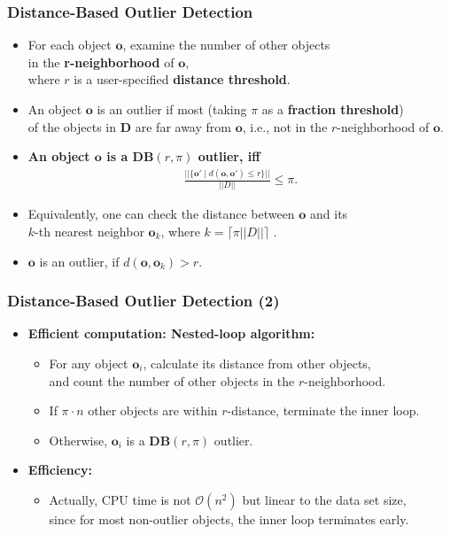 \begin{frame}
  \frametitle{Distance-Based Outlier Detection }
  \begin{itemize}
  \item For each object $\mathbf{o}$, examine the number of other objects \\
    in the \textbf{r-neighborhood} of $\mathbf{o}$, \\
    where $r$ is a user-specified \textbf{distance threshold}.
  \item An object $\mathbf{o}$ is an outlier if most (taking $\pi$ as a \textbf{fraction threshold}) \\
    of the objects in $\mathbf{D}$ are far away from $\mathbf{o}$, i.e., not in the $r$-neighborhood of $\mathbf{o}$.
  \end{itemize}
  \begin{itemize}
  \item \textbf{An object $\mathbf{o}$ is a $\mathbf{DB}(r, \pi)$ outlier, iff}
    \begin{align}
      \frac{||\{\mathbf{o'} \; \vert \; d(\mathbf{o},\mathbf{o'}) \leq r \}|| }{||D||} \leq \pi.
    \end{align}
  \item Equivalently, one can check the distance between $\mathbf{o}$ and its \\
    $k$-th nearest neighbor $\mathbf{o}_k$, where $k=\lceil \pi ||D||\rceil$                       . \\
  \item $\mathbf{o}$ is an outlier, if $d(\mathbf{o}, \mathbf{o}_k) > r$.
  \end{itemize}
\end{frame}


\begin{frame}
  \frametitle{Distance-Based Outlier Detection (2)}
  \begin{itemize}
  \item \textbf{Efficient computation: {\color{airforceblue}Nested-loop algorithm}:}
    \begin{itemize}
    \item For any object $\mathbf{o}_i$, calculate its distance from other objects, \\
      and count the number of other objects in the $r$-neighborhood.
    \item If $\pi \cdot n$ other objects are within $r$-distance, terminate the inner loop.
    \item Otherwise, $\mathbf{o}_i$ is a $\mathbf{DB}(r, \pi)$ outlier.
    \end{itemize}
  \item \textbf{Efficiency:}
    \begin{itemize}
    \item Actually, CPU time is not $\mathcal{O}(n^2)$ but linear to the data set size,\\
      since for most non-outlier objects, the inner loop terminates early.
    \end{itemize}
  \end{itemize}
\end{frame}


